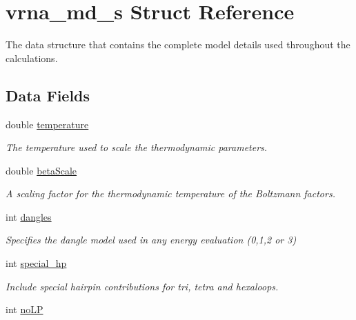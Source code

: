 \hypertarget{structvrna__md__s}{}\section{vrna\+\_\+md\+\_\+s Struct Reference}
\label{structvrna__md__s}


The data structure that contains the complete model details used throughout the calculations.  


\subsection*{Data Fields}
\begin{DoxyCompactItemize}
\item 
double \hyperlink{structvrna__md__s_a5f7e5c2b65bada5188443470e576aa4b}{temperature}\hypertarget{structvrna__md__s_a5f7e5c2b65bada5188443470e576aa4b}{}\label{structvrna__md__s_a5f7e5c2b65bada5188443470e576aa4b}

\begin{DoxyCompactList}\small\item\em The temperature used to scale the thermodynamic parameters. \end{DoxyCompactList}\item 
double \hyperlink{structvrna__md__s_a19524bf1d8d7ab590ed36edbbcaaba2c}{beta\+Scale}\hypertarget{structvrna__md__s_a19524bf1d8d7ab590ed36edbbcaaba2c}{}\label{structvrna__md__s_a19524bf1d8d7ab590ed36edbbcaaba2c}

\begin{DoxyCompactList}\small\item\em A scaling factor for the thermodynamic temperature of the Boltzmann factors. \end{DoxyCompactList}\item 
int \hyperlink{structvrna__md__s_adcda4ff2ea77748ae0e8700288282efc}{dangles}
\begin{DoxyCompactList}\small\item\em Specifies the dangle model used in any energy evaluation (0,1,2 or 3) \end{DoxyCompactList}\item 
int \hyperlink{structvrna__md__s_add64a96d23e77ef1d0ddf8dfc5228143}{special\+\_\+hp}\hypertarget{structvrna__md__s_add64a96d23e77ef1d0ddf8dfc5228143}{}\label{structvrna__md__s_add64a96d23e77ef1d0ddf8dfc5228143}

\begin{DoxyCompactList}\small\item\em Include special hairpin contributions for tri, tetra and hexaloops. \end{DoxyCompactList}\item 
int \hyperlink{structvrna__md__s_a753200bf21cee0ea2df64afe43999f5d}{no\+LP}\hypertarget{structvrna__md__s_a753200bf21cee0ea2df64afe43999f5d}{}\label{structvrna__md__s_a753200bf21cee0ea2df64afe43999f5d}


\end{DoxyCompactItemize}
